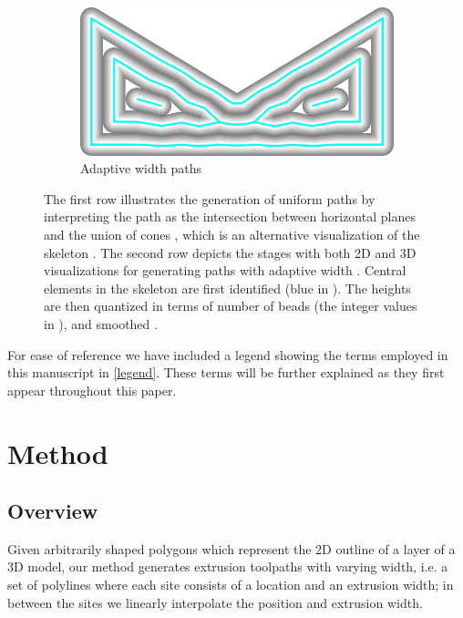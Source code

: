 \begin{figure}
\begin{subfigure}{\figwidth}
\includegraphics[width=\figheight]{sources-method-overview-2D-sliced.png}
\caption{Adaptive width paths}\label{3d_surface_overview_sliced}
\end{subfigure}
\caption{
The first row illustrates the generation of uniform paths 
by interpreting the path as the intersection between horizontal planes and the union of cones , which is an alternative visualization of the skeleton . 
The second row depicts the stages with both 2D and 3D visualizations for generating paths with adaptive width .
Central elements in the skeleton are first identified (blue in ).
The heights are then quantized in terms of number of beads (the integer values in ), and smoothed .
}
\label{3d_surface_overview}
\end{figure}

For ease of reference we have included a legend showing the terms employed in this manuscript in \cref{legend}.
These terms will be further explained as they first appear throughout this paper. 





\section{Method}
\subsection{Overview}

Given arbitrarily shaped polygons which represent the 2D outline of a layer of a 3D model, our method generates extrusion toolpaths with varying width, i.e. a set of polylines where each site consists of a location and an extrusion width;
in between the sites we linearly interpolate the position and extrusion width.

